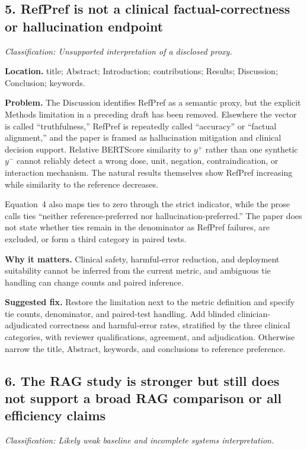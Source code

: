 \documentclass[11pt]{article}
\newcommand{\findinglabel}[1]{\textbf{#1}}
\newcommand{\classification}[1]{\textit{Classification: #1.}}
\begin{document}
\subsection*{5. RefPref is not a clinical factual-correctness or hallucination endpoint}

\classification{Unsupported interpretation of a disclosed proxy}

\findinglabel{Location.} title; Abstract; Introduction; contributions; Results; Discussion; Conclusion; keywords.

\findinglabel{Problem.} The Discussion identifies RefPref as a semantic proxy, but the explicit Methods limitation in a preceding draft has been removed.  Elsewhere the vector is called ``truthfulness,'' RefPref is repeatedly called ``accuracy'' or ``factual alignment,'' and the paper is framed as hallucination mitigation and clinical decision support.  Relative BERTScore similarity to $y^+$ rather than one synthetic $y^-$ cannot reliably detect a wrong dose, unit, negation, contraindication, or interaction mechanism.  The natural results themselves show RefPref increasing while similarity to the reference decreases.

Equation~4 also maps ties to zero through the strict indicator, while the prose calls ties ``neither reference-preferred nor hallucination-preferred.''  The paper does not state whether ties remain in the denominator as RefPref failures, are excluded, or form a third category in paired tests.

\findinglabel{Why it matters.} Clinical safety, harmful-error reduction, and deployment suitability cannot be inferred from the current metric, and ambiguous tie handling can change counts and paired inference.

\findinglabel{Suggested fix.} Restore the limitation next to the metric definition and specify tie counts, denominator, and paired-test handling.  Add blinded clinician-adjudicated correctness and harmful-error rates, stratified by the three clinical categories, with reviewer qualifications, agreement, and adjudication.  Otherwise narrow the title, Abstract, keywords, and conclusions to reference preference.

\subsection*{6. The RAG study is stronger but still does not support a broad RAG comparison or all efficiency claims}

\classification{Likely weak baseline and incomplete systems interpretation}
\end{document}

